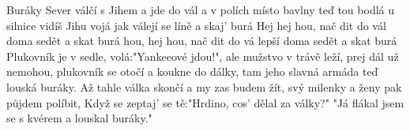 \begin{TEXT}{Buráky}
\SLOKA {} Sever válčí s Jihem a  jde do vál\NL
a v polích místo bavlny teď tou bodlá\NL
{} u silnice vidíš   Jihu vojá\NL
jak válejí se líně a skaj' burá
\REFREN Hej  hej hou, nač dit do vál\NL
{} doma sedět a skat burá\NL
{} hou, hej hou, nač dit do vá\NL
{} lepší doma sedět a skat burá
\SLOKA Plukovník je v sedle, volá:"Yankeeové jdou!",\NL
ale mužstvo v trávě leží, prej dál už nemohou,\NL
plukovník se otočí a koukne do dálky,\NL
tam jeho slavná armáda teď louská buráky.
\REFRENHRAJ
\SLOKA Až tahle válka skončí a my zas budem žít,\NL
svý milenky a ženy pak půjdem políbit,\NL
Když se zeptaj' se tě:"Hrdino, cos' dělal za války?"\NL
"Já flákal jsem se s kvérem a louskal buráky."
\REFRENHRAJ
\end{TEXT}
